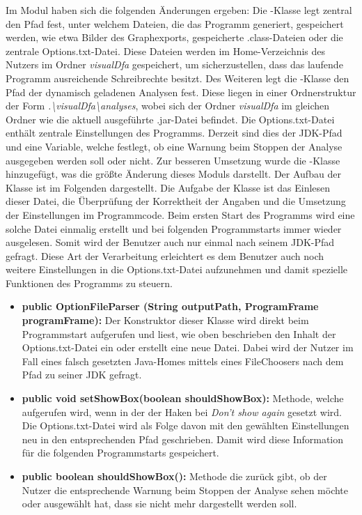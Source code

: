 Im Modul  haben sich die folgenden Änderungen ergeben: \newline
Die -Klasse legt zentral den Pfad fest, unter welchem Dateien, die das Programm generiert, gespeichert werden, wie etwa Bilder des Graphexports, gespeicherte .class-Dateien oder die zentrale Options.txt-Datei. Diese Dateien werden im Home-Verzeichnis des Nutzers im Ordner \textit{visualDfa} gespeichert, um sicherzustellen, dass das laufende Programm ausreichende Schreibrechte besitzt. Des Weiteren legt die -Klasse den Pfad der dynamisch geladenen Analysen fest. Diese liegen in einer Ordnerstruktur der Form \textit{.\textbackslash visualDfa\textbackslash analyses}, wobei sich der Ordner \textit{visualDfa} im gleichen Ordner wie die aktuell ausgeführte .jar-Datei befindet. \newline
Die Options.txt-Datei enthält zentrale Einstellungen des Programms. Derzeit sind dies der JDK-Pfad und eine Variable, welche festlegt, ob eine Warnung beim Stoppen der Analyse ausgegeben werden soll oder nicht. Zur besseren Umsetzung wurde die -Klasse hinzugefügt, was die größte Änderung dieses Moduls darstellt. Der Aufbau der Klasse ist im Folgenden dargestellt. Die Aufgabe der Klasse ist das Einlesen dieser Datei, die Überprüfung der Korrektheit der Angaben und die Umsetzung der Einstellungen im Programmcode. Beim ersten Start des Programms wird eine solche Datei einmalig erstellt und bei folgenden Programmstarts immer wieder ausgelesen. Somit wird der Benutzer auch nur einmal nach seinem JDK-Pfad gefragt. Diese Art der Verarbeitung erleichtert es dem Benutzer auch noch weitere Einstellungen in die Options.txt-Datei aufzunehmen und damit spezielle Funktionen des Programms zu steuern.\newline

\begin{itemize}
	\item \textbf{public OptionFileParser (String outputPath, ProgramFrame programFrame):} Der Konstruktor dieser Klasse wird direkt beim Programmstart aufgerufen und liest, wie oben beschrieben den Inhalt der Options.txt-Datei ein oder erstellt eine neue Datei. Dabei wird der Nutzer im Fall eines falsch gesetzten Java-Homes mittels eines FileChoosers nach dem Pfad zu seiner JDK gefragt.
	\item \textbf{public void setShowBox(boolean shouldShowBox):} Methode, welche aufgerufen wird, wenn in der  der Haken bei \textit{Don't show again} gesetzt wird. Die Options.txt-Datei wird als Folge davon mit den gewählten Einstellungen neu in den entsprechenden Pfad geschrieben. Damit wird diese Information für die folgenden Programmstarts gespeichert.
	\item \textbf{public boolean shouldShowBox():} Methode die zurück gibt, ob der Nutzer die entsprechende Warnung beim Stoppen der Analyse sehen möchte oder ausgewählt hat, dass sie nicht mehr dargestellt werden soll. 
\end{itemize}
